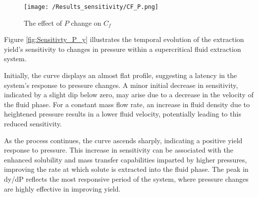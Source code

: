 \documentclass[../Article_Sensitivity_Analsysis.tex]{subfiles}
\begin{document}

	\begin{figure}[h!]
		\centering
		\texttt{[image: /Results\_sensitivity/CF\_P.png]}
		\caption{The effect of $P$ change on $C_f$}
		\label{fig:Sensitivty_P_CF}
	\end{figure}

	Figure \ref{fig:Sensitivty_P_y} illustrates the temporal evolution of the extraction yield's sensitivity to changes in pressure within a supercritical fluid extraction system. 
	
	Initially, the curve displays an almost flat profile, suggesting a latency in the system's response to pressure changes. A minor initial decrease in sensitivity, indicated by a slight dip below zero, may arise due to a decrease in the velocity of the fluid phase. For a constant mass flow rate, an increase in fluid density due to heightened pressure results in a lower fluid velocity, potentially leading to this reduced sensitivity.
	
	As the process continues, the curve ascends sharply, indicating a positive yield response to pressure. This increase in sensitivity can be associated with the enhanced solubility and mass transfer capabilities imparted by higher pressures, improving the rate at which solute is extracted into the fluid phase. The peak in dy/dP reflects the most responsive period of the system, where pressure changes are highly effective in improving yield.
	
\end{document}
